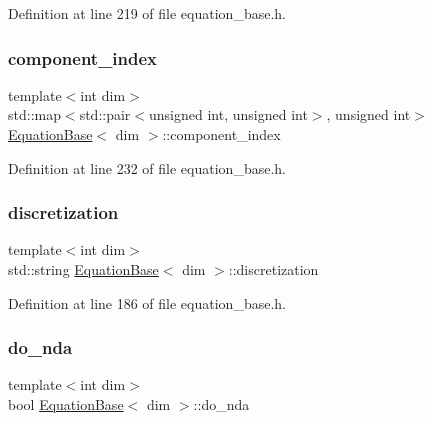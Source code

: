 Definition at line 219 of file equation\+\_\+base.\+h.

\mbox{\label{class_equation_base_a7e2b3d305d1f1f7799acff6c86bc67f8}} 
\subsubsection{\texorpdfstring{component\+\_\+index}{component\_index}}
{\footnotesize\ttfamily template$<$int dim$>$ \\
std\+::map$<$std\+::pair$<$unsigned int, unsigned int$>$, unsigned int$>$ \hyperlink{class_equation_base}{Equation\+Base}$<$ dim $>$\+::component\+\_\+index\hspace{0.3cm}{\ttfamily [protected]}}



Definition at line 232 of file equation\+\_\+base.\+h.

\mbox{\label{class_equation_base_adf124367d26087d33b6f252aa3cdd0a3}} 
\subsubsection{\texorpdfstring{discretization}{discretization}}
{\footnotesize\ttfamily template$<$int dim$>$ \\
std\+::string \hyperlink{class_equation_base}{Equation\+Base}$<$ dim $>$\+::discretization\hspace{0.3cm}{\ttfamily [protected]}}



Definition at line 186 of file equation\+\_\+base.\+h.

\mbox{\label{class_equation_base_a908f21db148a15d7d51a8508aa1fc58a}} 
\subsubsection{\texorpdfstring{do\+\_\+nda}{do\_nda}}
{\footnotesize\ttfamily template$<$int dim$>$ \\
bool \hyperlink{class_equation_base}{Equation\+Base}$<$ dim $>$\+::do\+\_\+nda\hspace{0.3cm}{\ttfamily [protected]}}



